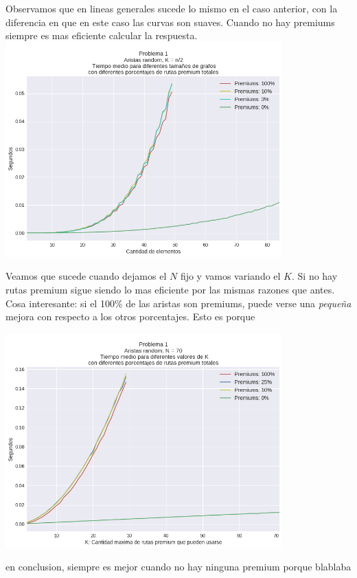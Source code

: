 Observamos que en lineas generales sucede lo mismo en el caso anterior, con la diferencia en que en este caso las curvas son suaves. Cuando no hay premiums siempre es mas eficiente calcular la respuesta. \\

{\centering
  \includegraphics[width=0.8\textwidth]{imagenes/problema1/kfijo.png} \\
}

Veamos que sucede cuando dejamos el $N$ fijo y vamos variando el $K$. Si no hay rutas premium sigue siendo lo mas eficiente por las mismas razones que antes. \\

Cosa interesante: si el 100\% de las aristas son premiums, puede verse una \textit{pequeña} mejora con respecto a los otros porcentajes. Esto es porque 


{\centering
  \includegraphics[width=0.8\textwidth]{imagenes/problema1/nfijo.png} \\
}

en conclusion, siempre es mejor cuando no hay ninguna premium porque blablaba
